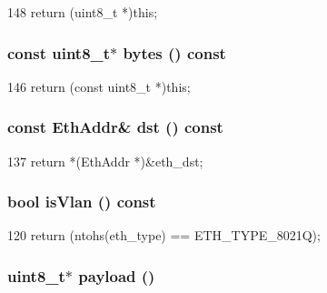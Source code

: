 \begin{DoxyCode}
148 { return (uint8_t *)this; }
\end{DoxyCode}
\hypertarget{structNet_1_1EthHdr_aaa586eeaf354005403ca8e20f961b6c3}{
\subsubsection[{bytes}]{\setlength{\rightskip}{0pt plus 5cm}const uint8\_\-t$\ast$ bytes () const}}
\label{structNet_1_1EthHdr_aaa586eeaf354005403ca8e20f961b6c3}



\begin{DoxyCode}
146 { return (const uint8_t *)this; }
\end{DoxyCode}
\hypertarget{structNet_1_1EthHdr_a69ca058eabf9eab6f3aba644b89a65e0}{
\subsubsection[{dst}]{\setlength{\rightskip}{0pt plus 5cm}const {\bf EthAddr}\& dst () const}}
\label{structNet_1_1EthHdr_a69ca058eabf9eab6f3aba644b89a65e0}



\begin{DoxyCode}
137 { return *(EthAddr *)&eth_dst; }
\end{DoxyCode}
\hypertarget{structNet_1_1EthHdr_ab77c052e3da73dead20179a30fe14546}{
\subsubsection[{isVlan}]{\setlength{\rightskip}{0pt plus 5cm}bool isVlan () const}}
\label{structNet_1_1EthHdr_ab77c052e3da73dead20179a30fe14546}



\begin{DoxyCode}
120 { return (ntohs(eth_type) == ETH_TYPE_8021Q); }
\end{DoxyCode}
\hypertarget{structNet_1_1EthHdr_a79ce21e3572e587b71de7af1ac640b6f}{
\subsubsection[{payload}]{\setlength{\rightskip}{0pt plus 5cm}uint8\_\-t$\ast$ payload ()}}
\label{structNet_1_1EthHdr_a79ce21e3572e587b71de7af1ac640b6f}




